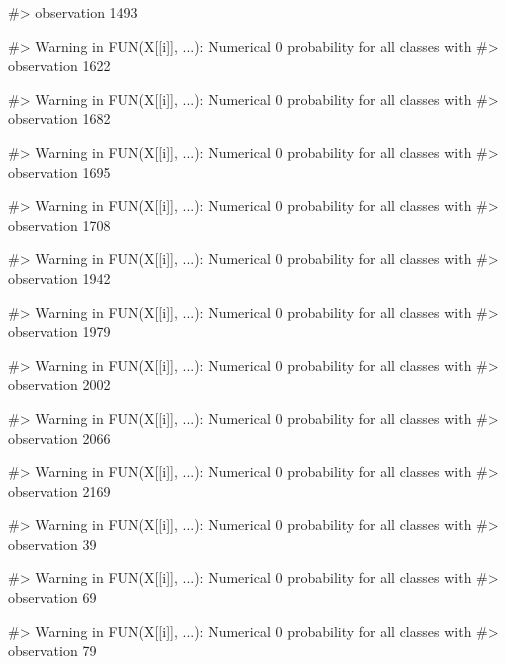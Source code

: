 \begin{Schunk}
\begin{Soutput}
#> observation 1493
\end{Soutput}
\begin{Soutput}
#> Warning in FUN(X[[i]], ...): Numerical 0 probability for all classes with
#> observation 1622
\end{Soutput}
\begin{Soutput}
#> Warning in FUN(X[[i]], ...): Numerical 0 probability for all classes with
#> observation 1682
\end{Soutput}
\begin{Soutput}
#> Warning in FUN(X[[i]], ...): Numerical 0 probability for all classes with
#> observation 1695
\end{Soutput}
\begin{Soutput}
#> Warning in FUN(X[[i]], ...): Numerical 0 probability for all classes with
#> observation 1708
\end{Soutput}
\begin{Soutput}
#> Warning in FUN(X[[i]], ...): Numerical 0 probability for all classes with
#> observation 1942
\end{Soutput}
\begin{Soutput}
#> Warning in FUN(X[[i]], ...): Numerical 0 probability for all classes with
#> observation 1979
\end{Soutput}
\begin{Soutput}
#> Warning in FUN(X[[i]], ...): Numerical 0 probability for all classes with
#> observation 2002
\end{Soutput}
\begin{Soutput}
#> Warning in FUN(X[[i]], ...): Numerical 0 probability for all classes with
#> observation 2066
\end{Soutput}
\begin{Soutput}
#> Warning in FUN(X[[i]], ...): Numerical 0 probability for all classes with
#> observation 2169
\end{Soutput}
\begin{Soutput}
#> Warning in FUN(X[[i]], ...): Numerical 0 probability for all classes with
#> observation 39
\end{Soutput}
\begin{Soutput}
#> Warning in FUN(X[[i]], ...): Numerical 0 probability for all classes with
#> observation 69
\end{Soutput}
\begin{Soutput}
#> Warning in FUN(X[[i]], ...): Numerical 0 probability for all classes with
#> observation 79
\end{Soutput}
\begin{Soutput}

\end{Soutput}
\end{Schunk}
